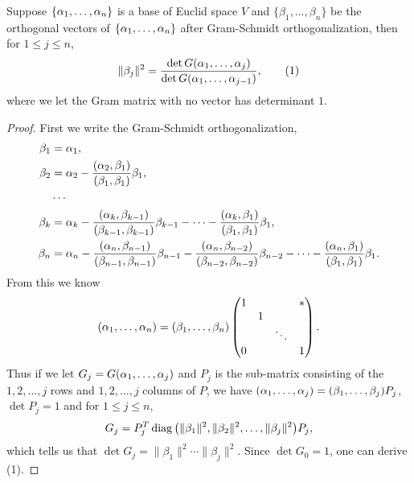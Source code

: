 \begin{pro}%
	Suppose $\{\alpha_1,\dots,\alpha_n\}$ is a base of Euclid space $V$ and $\{\beta_1,\dots,\beta_n\}$ be the orthogonal vectors of $\{\alpha_1,\dots,\alpha_n\}$ after Gram-Schmidt orthogonalization, then for $1\leq j\leq n$,
	\[\|\beta_j\|^2=\frac{\det G(\alpha_1,\dots,\alpha_j)}{\det G(\alpha_1,\dots,\alpha_{j-1})},\tag{1}\]
	where we let the Gram matrix with no vector has determinant $1$.
\end{pro}
\begin{proof}
	First we write the Gram-Schmidt orthogonalization,
	\begin{align*}
		\beta_1&=\alpha_1,\\
		\beta_2&=\alpha_2-\frac{(\alpha_2,\beta_1)}{(\beta_1,\beta_1)}\beta_1,\\
		&\cdots\\
		\beta_k&=\alpha_k-\frac{(\alpha_k,\beta_{k-1})}{(\beta_{k-1},\beta_{k-1})}\beta_{k-1}-\dots-
		\frac{(\alpha_k,\beta_1)}{(\beta_1,\beta_1)}\beta_1,\\
		\beta_n&=\alpha_n-\frac{(\alpha_n,\beta_{n-1})}{(\beta_{n-1},\beta_{n-1})}\beta_{n-1}-
		\frac{(\alpha_n,\beta_{n-2})}{(\beta_{n-2},\beta_{n-2})}\beta_{n-2}-\dots-
		\frac{(\alpha_n,\beta_1)}{(\beta_1,\beta_1)}\beta_1.
	\end{align*}
	From this we know
	\[(\alpha_1,\dots,\alpha_n)=(\beta_1,\dots,\beta_n)\begin{pmatrix}
	1 & & &*\\
	  &1& & \\
	  & &\ddots&\\
	0 & & &1\end{pmatrix}.\]
	Thus if we let $G_j=G(\alpha_1,\dots,\alpha_j)$ and $P_j$ is the sub-matrix consisting of the $1,2,\dots,j$ rows and $1,2,\dots,j$ columns of $P$, we have $(\alpha_1,\dots,\alpha_j)=(\beta_1,\dots,\beta_j)P_j$, $\det P_j=1$ and for $1\leq j\leq n$,
	\[G_j=P_j^T\operatorname*{diag}\big(\|\beta_1\|^2,\|\beta_2\|^2,\dots,\|\beta_j\|^2\big)P_j,\]
	which tells us that $\det G_j=\|\beta_1\|^2\cdots\|\beta_j\|^2$. Since $\det G_0=1$, one can derive (1).
\end{proof}

